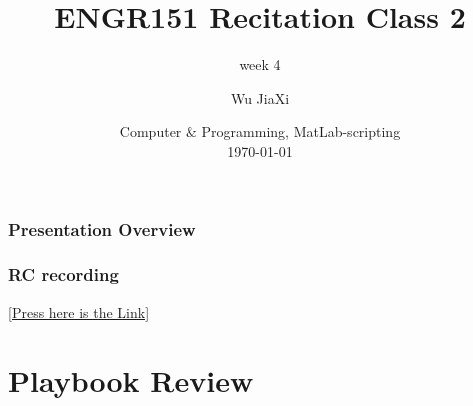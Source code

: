 \documentclass[
	11pt, %
]{beamer}
\title[Computer \& Programming, MATLAB]{ENGR151 Recitation Class 2} %
\subtitle{week 4} %
\author[Wu JiaXi]{Wu JiaXi} %
\institute[UM-SJTU joint institute]{UM-SJTU joint institute \\ \smallskip \textit{nina$\_$nhk@sjtu.edu.cn}} %
\date[\today]{Computer $\&$ Programming, MatLab-scripting \\ \today} %
\begin{document}

\begin{frame}
	\titlepage %
\end{frame}



\begin{frame}
	\frametitle{Presentation Overview} %
	
	\tableofcontents %
\end{frame}


\begin{frame}
    \frametitle{RC recording}
    \href{https://sjtu.feishu.cn/minutes/obcn9p39e48eb872rv3cum1c?from=from_copylink}{[Press here is the Link]}
    
\end{frame}

\section{Playbook Review} %
\end{document}
